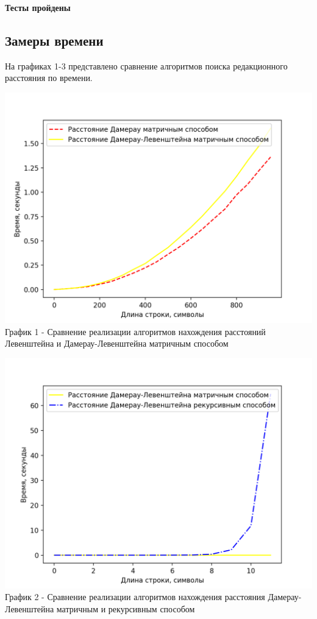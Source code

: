 \documentclass[a4paper,14pt]{article} %
\begin{document}
	\textbf{Тесты пройдены}

	\subsection{Замеры времени}
	
	\hfill
	
	На графиках 1-3 представлено сравнение алгоритмов поиска редакционного расстояния по времени. 
	
	\begin{center}
        		\includegraphics[scale = 1]{graph1} \\ График 1 - Сравнение реализации алгоритмов нахождения расстояний Левенштейна и Дамерау-Левенштейна матричным способом
	\end{center}
	
	\begin{center}
        		\includegraphics[scale = 1]{graph2} \\ График 2 - Сравнение реализации алгоритмов нахождения расстояния Дамерау-Левенштейна матричным и рекурсивным способом
	\end{center}
	
\end{document}
